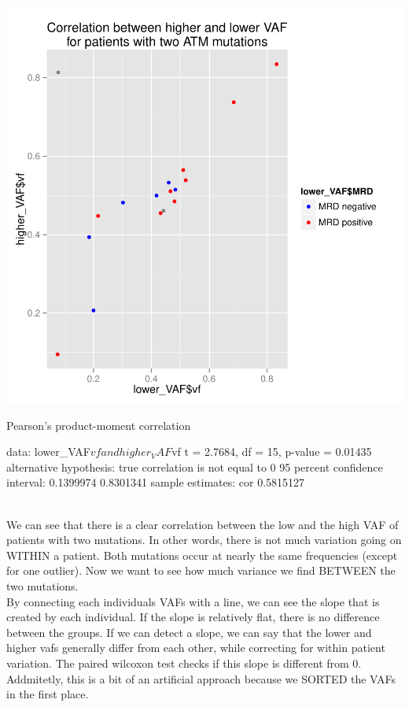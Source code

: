 \documentclass[a4paper,11pt]{article}
\begin{document}
\includegraphics{ATM_VAF-009}
\begin{Schunk}
\begin{Soutput}
	Pearson's product-moment correlation

data:  lower_VAF$vf and higher_VAF$vf
t = 2.7684, df = 15, p-value = 0.01435
alternative hypothesis: true correlation is not equal to 0
95 percent confidence interval:
 0.1399974 0.8301341
sample estimates:
      cor 
0.5815127 
\end{Soutput}
\end{Schunk}
\\We can see that there is a clear correlation between the low and the high VAF of patients with two mutations. In other words, there is not much variation going on WITHIN a patient. Both mutations occur at nearly the same frequencies (except for one outlier). Now we want to see how much variance we find BETWEEN the two mutations.\\
By connecting each individuals VAFs with a line, we can see the slope that is created by each individual. If the slope is relatively flat, there is no difference between the groups. If we can detect a slope, we can say that the lower and higher vafs generally differ from each other, while correcting for within patient variation. The paired wilcoxon test checks if this slope is different from 0. Addmitetly, this is a bit of an artificial approach because we SORTED the VAFs in the first place.\\
\end{document}
